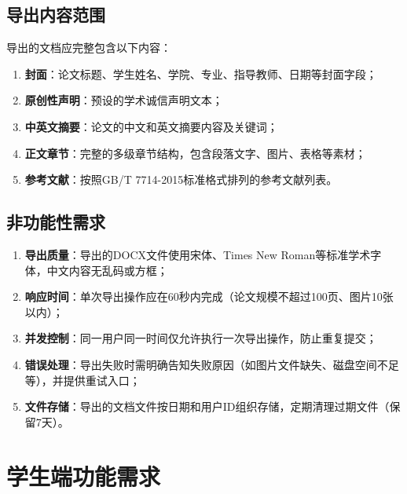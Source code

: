 \documentclass{../../softeng}
\begin{document}
\subsection{导出内容范围}

导出的文档应完整包含以下内容：

\begin{enumerate}
    \item \textbf{封面}：论文标题、学生姓名、学院、专业、指导教师、日期等封面字段；
    \item \textbf{原创性声明}：预设的学术诚信声明文本；
    \item \textbf{中英文摘要}：论文的中文和英文摘要内容及关键词；
    \item \textbf{正文章节}：完整的多级章节结构，包含段落文字、图片、表格等素材；
    \item \textbf{参考文献}：按照GB/T 7714-2015标准格式排列的参考文献列表。
\end{enumerate}

\subsection{非功能性需求}

\begin{enumerate}
    \item \textbf{导出质量}：导出的DOCX文件使用宋体、Times New Roman等标准学术字体，中文内容无乱码或方框；
    \item \textbf{响应时间}：单次导出操作应在60秒内完成（论文规模不超过100页、图片10张以内）；
    \item \textbf{并发控制}：同一用户同一时间仅允许执行一次导出操作，防止重复提交；
    \item \textbf{错误处理}：导出失败时需明确告知失败原因（如图片文件缺失、磁盘空间不足等），并提供重试入口；
    \item \textbf{文件存储}：导出的文档文件按日期和用户ID组织存储，定期清理过期文件（保留7天）。
\end{enumerate}

\section{学生端功能需求}
\end{document}
